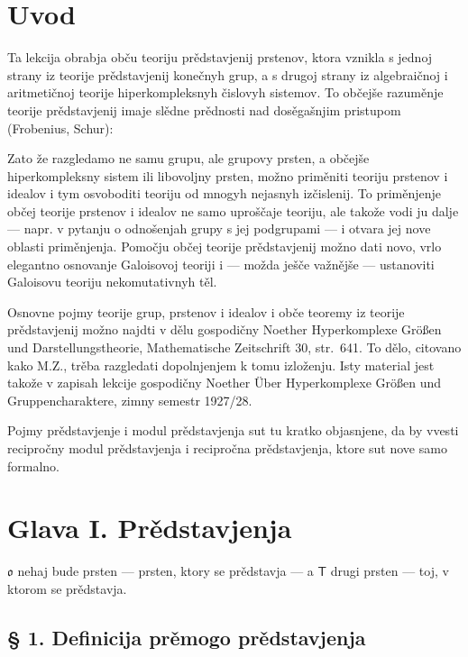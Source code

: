 \documentclass[11pt]{article}
\newcommand{\foreign}[1]{#1}
\begin{document}
\clearpage
\section*{Uvod}\label{einleitung}

Ta lekcija obrabja obču teoriju prědstavjenij prstenov, ktora vznikla s
jednoj strany iz teorije prědstavjenij konečnyh grup, a s drugoj strany
iz algebraičnoj i aritmetičnoj teorije hiperkompleksnyh čislovyh
sistemov. To občejše razuměnje teorije prědstavjenij imaje slědne
prědnosti nad dosěgašnjim pristupom (\foreign{Frobenius},
\foreign{Schur}):

Zato že razgledamo ne samu grupu, ale grupovy prsten, a občejše
hiperkompleksny sistem ili libovoljny prsten, možno priměniti
teoriju prstenov i idealov i tym osvoboditi teoriju od mnogyh nejasnyh
izčislenij. To priměnjenje občej teorije prstenov i idealov ne samo
uproščaje teoriju, ale takože vodi ju dalje --- napr. v pytanju o
odnošenjah grupy s jej podgrupami --- i otvara jej nove oblasti
priměnjenja. Pomočju občej teorije prědstavjenij možno dati novo, vrlo
elegantno osnovanje Galoisovoj teoriji i --- možda ješče važnějše ---
ustanoviti Galoisovu teoriju nekomutativnyh těl.

Osnovne pojmy teorije grup, prstenov i idealov i obče teoremy iz teorije
prědstavjenij možno najdti v dělu gospodičny \foreign{Noether}
\foreign{Hyperkomplexe Größen und Darstellungstheorie},
\foreign{Mathematische Zeitschrift} 30, str.~641. To dělo, citovano
kako \foreign{M.Z.}, trěba razgledati dopolnjenjem k tomu izloženju.
Isty material jest takože v zapisah lekcije gospodičny
\foreign{Noether} \foreign{Über Hyperkomplexe Größen und
Gruppencharaktere}, zimny semestr 1927/28.

Pojmy prědstavjenje i modul prědstavjenja sut tu kratko objasnjene,
da by vvesti recipročny modul prědstavjenja i recipročna
prědstavjenja, ktore sut nove samo formalno.

\section*{Glava I. Prědstavjenja}\label{kapitel-i.-darstellungen}

$\mathfrak{o}$ nehaj bude prsten --- prsten, ktory se prědstavja --- a
$\mathsf T$ drugi prsten --- toj, v ktorom se prědstavja.

\subsection*{§ 1. Definicija prěmogo prědstavjenja}\label{definition-der-direkten-darstellung}
\end{document}
